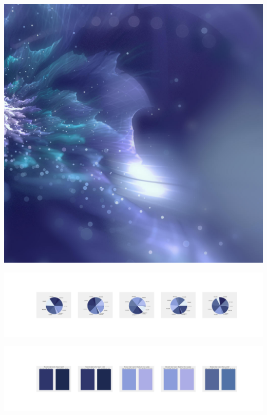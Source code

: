 \documentclass[11pt]{article}
\begin{document}
\begin{landscape}
    \begin{center}
    \includegraphics[width=\textwidth]{./nbimg/file (393).jpg}
    \end{center}

    \begin{center}
    \includegraphics[width=250mm]{./nbimg/pie-326.jpg}
    \end{center}

    \begin{center}
    \includegraphics[width=250mm]{./nbimg/peak-326.jpg}
    \end{center}
    


\end{landscape}
\end{document}
